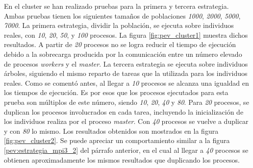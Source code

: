 	
	
	
		En el cluster se han realizado pruebas para la primera y tercera estrategia. Ambas pruebas tienen los siguientes tamaños de poblaciones \textit{1000}, \textit{2000}, \textit{5000}, \textit{7000}. La primera estrategia, dividir la población, se ejecuta sobre individuos reales, con \textit{10}, \textit{20}, \textit{50}, y \textit{100} procesos. La figura \ref{fig:pev_cluster1} muestra dichos resultados. A partir de \textit{20} procesos no se logra reducir el tiempo de ejecución debido a la sobrecarga producida por la comunicación entre un número elevado de procesos \textit{workers} y el \textit{master}. La tercera estrategia se ejecuta sobre individuos árboles, siguiendo el mismo reparto de tareas que la utilizada para los individuos reales. Como se comentó antes, al llegar a \textit{10} procesos se alcanza una igualdad en los tiempos de ejecución. Es por esos que los procesos ejecutados para esta prueba son múltiplos de este número, siendo \textit{10}, \textit{20}, \textit{40} y \textit{80}. Para \textit{20} procesos, se duplican los procesos involucrados en cada tarea, incluyendo la inicialización de los individuos realiza por el proceso \textit{master}. Con \textit{40} procesos se vuelve a duplicar y con \textit{80} lo mismo. Los resultados obtenidos son mostrados en la figura \ref{fig:pev_cluster2}. Se puede apreciar un comportamiento similar a la figura \ref{pev:estrategia_mpi3_2} del párrafo anterior, en el cual al llegar a \textit{40} procesos se obtienen aproximadamente los mismos resultados que duplicando los procesos.
	
	
	
